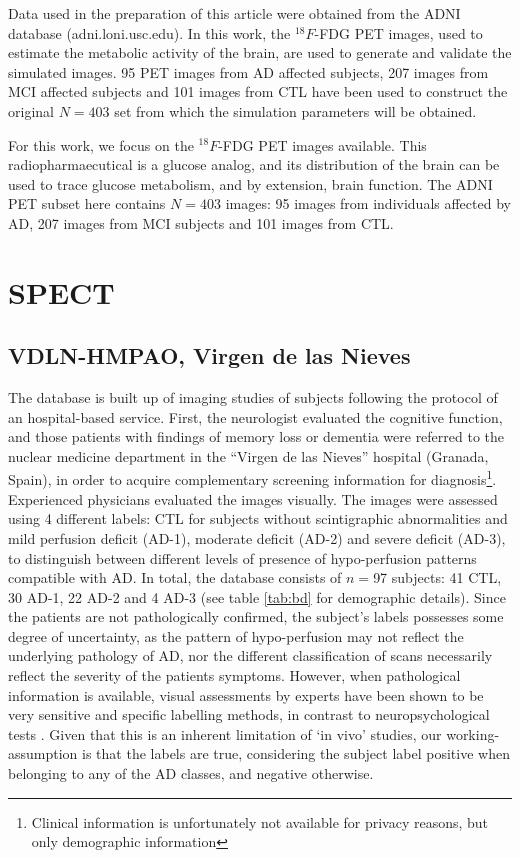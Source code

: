 Data used in the preparation of this article were obtained from the \ac{ADNI} database (adni.loni.usc.edu). In this work, the $^{18}F$-FDG \ac{PET} images, used to estimate the metabolic activity of the brain, are used to generate and validate the simulated images. 95 \ac{PET} images from \ac{AD} affected subjects,  207 images from \ac{MCI} affected subjects and 101 images from \ac{CTL} have been used to construct the original $N=403$ set from which the simulation parameters will be obtained. 


For this work, we focus on the $^{18}F$-FDG \ac{PET} images available. This radiopharmaecutical is a glucose analog, and its distribution of the brain can be used to trace glucose metabolism, and by extension, brain function. The \ac{ADNI} \ac{PET} subset here contains $N=403$ images: 95 images from individuals affected by  \ac{AD}, 207 images from \ac{MCI} subjects and 101 images from  \ac{CTL}. 

\section{\acs{SPECT}}

\subsection{VDLN-HMPAO, Virgen de las Nieves}\label{sec:vdlnhmpao}
The database is built up of imaging studies of subjects following the protocol of an hospital-based service. First, the neurologist evaluated the cognitive function, and those patients with findings of memory loss or dementia were referred to the nuclear medicine department in the ``Virgen de las Nieves'' hospital (Granada, Spain), in order to acquire complementary screening information for diagnosis\footnote{Clinical information is unfortunately not available for privacy reasons, but only demographic  information}. Experienced physicians evaluated the images visually. The images were assessed using 4 different labels: \ac{CTL} for subjects without scintigraphic abnormalities and mild perfusion deficit (\ac{AD}-1), moderate deficit (\ac{AD}-2) and severe deficit (\ac{AD}-3), to distinguish between different levels of presence of hypo-perfusion patterns compatible with \ac{AD}. In total, the database consists of $n=$97 subjects: 41 \ac{CTL}, 30 \ac{AD}-1, 22 \ac{AD}-2 and 4 \ac{AD}-3 (see table \ref{tab:bd} for demographic details). Since the patients are not pathologically confirmed, the subject's labels possesses some degree of uncertainty, as the pattern of hypo-perfusion may not reflect the underlying pathology of AD, nor the different classification of scans necessarily reflect the severity of the patients symptoms. However, when pathological information is available, visual assessments by experts have been shown to be very sensitive and specific labelling methods, in contrast to neuropsychological tests \cite{jobst_accurate_1998,dougall_systematic_2004}. Given that this is an inherent limitation of `in vivo' studies, our working-assumption is that the labels are true, considering the subject label positive when belonging to any of the \ac{AD} classes, and negative otherwise. 

